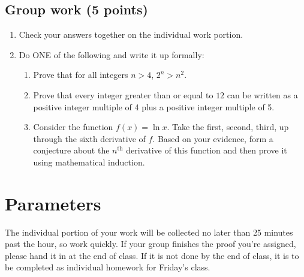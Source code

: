 \documentclass[11pt]{article}
\begin{document}
\subsection*{Group work (5 points)}

\begin{enumerate}
	\item Check your answers together on the individual work portion. 
	\item Do ONE of the following and write it up formally: 
	\begin{enumerate}
		\item Prove that for all integers $n > 4$, $2^n > n^2$.
		\item Prove that every integer greater than or equal to $12$ can be written as a positive integer multiple of 4 plus a positive integer multiple of 5.
		\item Consider the function $f(x) = \ln x$. Take the first, second, third, up through the sixth derivative of $f$. Based on your evidence, form a conjecture about the $n^\text{th}$ derivative of this function and then prove it using mathematical induction. 
	\end{enumerate}
\end{enumerate}
	
\section*{Parameters}

The individual portion of your work will be collected no later than 25 minutes past the hour, so work quickly. If your group finishes the proof you're assigned, please hand it in at the end of class. If it is not done by the end of class, it is to be completed as individual homework for Friday's class. 
\end{document}
